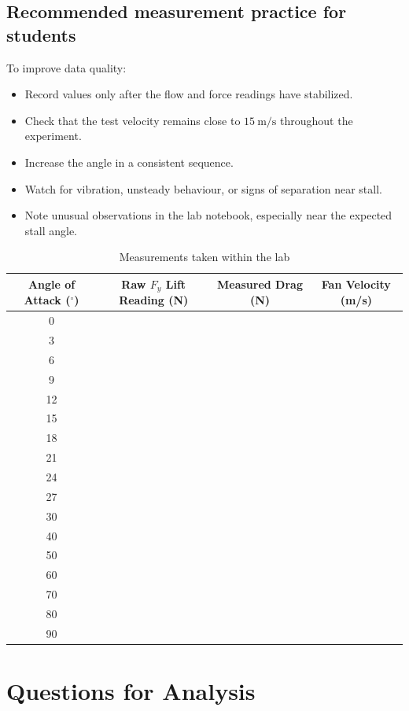\documentclass[12pt,letterpaper]{article}
\begin{document}
\subsection*{Recommended measurement practice for students}
To improve data quality:
\begin{itemize}[leftmargin=*]
    \item Record values only after the flow and force readings have stabilized.
    \item Check that the test velocity remains close to \(15~\text{m/s}\) throughout the experiment.
    \item Increase the angle in a consistent sequence.
    \item Watch for vibration, unsteady behaviour, or signs of separation near stall.
    \item Note unusual observations in the lab notebook, especially near the expected stall angle.
\end{itemize}

\begin{table}[H]
\centering
\caption{Measurements taken within the lab}
\label{tab:measurements}
\small
\begin{tabular}{cccc}
\toprule
Angle of Attack (\(^\circ\)) & Raw \(F_y\) Lift Reading (N) & Measured Drag (N) & Fan Velocity (m/s) \\
\midrule
0  & & & \\
3  & & & \\
6  & & & \\
9  & & & \\
12 & & & \\
15 & & & \\
18 & & & \\
21 & & & \\
24 & & & \\
27 & & & \\
30 & & & \\
40 & & & \\
50 & & & \\
60 & & & \\
70 & & & \\
80 & & & \\
90 & & & \\
\bottomrule
\end{tabular}
\end{table}

\section{Questions for Analysis}
\end{document}
